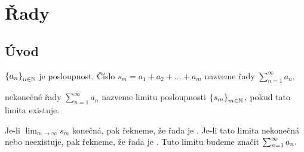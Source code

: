 \section{Řady}

\subsection{Úvod}

\begin{definition}
    \label{df:rady}
    \Necht $\left\{a_n\right\}_{n\in\mathbb{N}}$ je posloupnost. Číslo $s_m = a_1 + a_2 + \dots
    + a_m$ nazveme  řady $\sum_{n=1}^\infty a_n.$
    
     nekonečné řady $\sum_{n=1}^\infty a_n$ nazveme limitu
    posloupnosti $\left\{s_m\right\}_{m\in\mathbb{N}},$ pokud tato limita existuje.

    Je-li $\lim_{m\to\infty} s_m$ konečná, pak řekneme, že řada je 
    . Je-li tato limita nekonečná nebo neexistuje,
    pak řekneme, že řada je . Tuto limitu budeme
    značit $\sum_{n=1}^\infty a_n.$
\end{definition}

